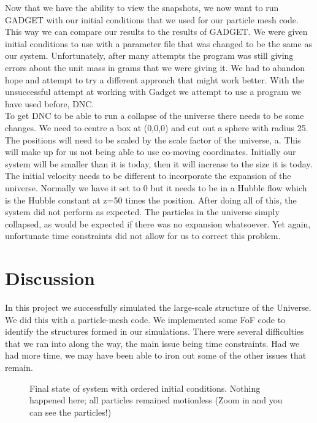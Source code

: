 \documentclass[10pt]{article}
\begin{document}
	Now that we have the ability to view the snapshots, we now want to run GADGET with our initial conditions that we used for our particle mesh code. This way we can compare our results to the results of GADGET. We were given initial conditions to use with a parameter file that was changed to be the same as our system. Unfortunately, after many attempts the program was still giving errors about the unit mass in grams that we were giving it. We had to abandon hope and attempt to try a different approach that might work better. With the unsuccessful attempt at working with Gadget we attempt to use a program we have used before, DNC.\\
	To get DNC to be able to run a collapse of the universe there needs to be some changes. We need to centre a box at (0,0,0) and cut out a sphere with radius 25.  The positions will need to be scaled by the scale factor of the universe, a. This will make up for us not being able to use co-moving coordinates. Initially our system will be smaller than it is today, then it will increase to the size it is today. The initial velocity needs to be different to incorporate the expansion of the universe. Normally we have it set to 0 but it needs to be in a Hubble flow which is the Hubble constant at z=50 times the position.
	After doing all of this, the system did not perform as expected. The particles in the universe simply collapsed, as would be expected if there was no expansion whatsoever. Yet again, unfortunate time constraints did not allow for us to correct this problem.


\section{Discussion}
	In this project we successfully simulated the large-scale structure of the Universe. We did this with a particle-mesh code. We implemented some FoF code to identify the structures formed in our simulations. There were several difficulties that we ran into along the way, the main issue being time constraints. Had we had more time, we may have been able to iron out some of the other issues that remain. 



\begin{figure}[htbp]
\centering

\caption{Final state of system with ordered initial conditions. Nothing happened here; all particles remained motionless (Zoom in and you can see the particles!)}
\label{fig:order}
\end{figure}
\end{document}
